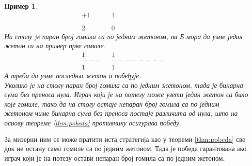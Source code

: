 \documentclass[a4paper]{article}
\newtheorem{example}{Пример}
\begin{document}
\begin{example}
\begin{align*}
			+1&		&  	  	1&\\
			---&	&--------&\\
			2&		&       0
		\end{align*}
	На столу je паран број гомила са по једним жетоном, па \textit{Б} мора да узме један жетон са на пример прве гомиле.
		\begin{align*}
			1&		&  	  	1&\\
			---&	&--------&\\
			1&		&       1
		\end{align*}
	\textit{А} треба да узме последњи жетон и побеђује.\\
	Уколико је на столу паран број гомила са по једним жетоном, тада је бинарна сума без преноса нула. Играч који је на потезу може узети један жетон са било које гомиле, тако да на столу остаје непаран број гомила са по једним жетоном чиме бинарна сума без преноса постаје различита од нула, што на основу теореме \ref{thm:pobeda} противнику осигурава победу.
\end{example}

За мизерни ним се може пратити иста стратегија као у теореми \ref{thm:pobeda} све док не остану само гомиле са по једним жетоном. Тада је победа гарантована ако играч који је на потезу остави непаран број гомила са по једним жетоном.
\end{document}

